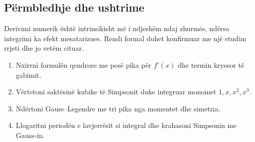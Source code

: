 \subsection{Përmbledhje dhe ushtrime}
Derivimi numerik është intrinsikisht më i ndjeshëm ndaj zhurmës, ndërsa integrimi ka efekt mesatarizues. Rendi formal duhet konfirmuar me një studim rrjeti dhe jo vetëm cituar.
\begin{enumerate}
\item Nxirrni formulën qendrore me pesë pika për $f'(x)$ dhe termin kryesor të gabimit.
\item Vërtetoni saktësinë kubike të Simpsonit duke integruar monomet $1,x,x^2,x^3$.
\item Ndërtoni Gauss--Legendre me tri pika nga momentet dhe simetria.
\item Llogaritni periodën e lavjerrësit si integral dhe krahasoni Simpsonin me Gauss-in.
\end{enumerate}
